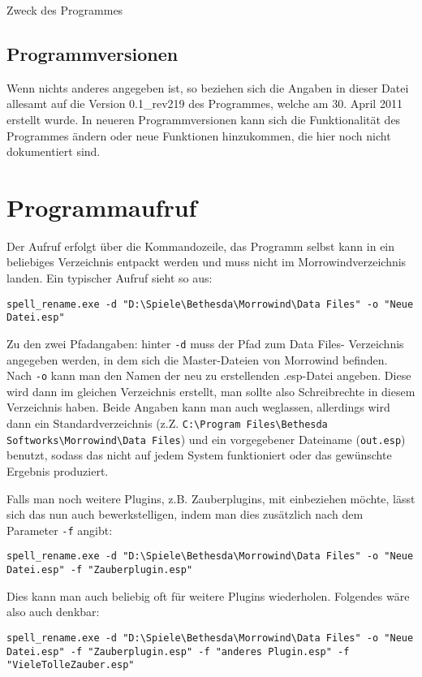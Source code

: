 \documentclass[12pt,oneside,a4paper]{article}
\begin{document}
\begin{section}{Zweck des Programmes}
\subsection{Programmversionen}
Wenn nichts anderes angegeben ist, so beziehen sich die Angaben in dieser Datei
allesamt auf die Version 0.1\_rev219 des Programmes, welche am 30. April 2011
erstellt wurde. In neueren Programmversionen kann sich die Funktionalit\"{a}t des
Programmes \"{a}ndern oder neue Funktionen hinzukommen, die hier noch nicht
dokumentiert sind.
\end{section}

\section{Programmaufruf}
Der Aufruf erfolgt \"{u}ber die Kommandozeile, das Programm selbst kann in ein
beliebiges Verzeichnis entpackt werden und muss nicht im Morrowindverzeichnis
landen. Ein typischer Aufruf sieht so aus:

\texttt{spell\_rename.exe -d "D:\textbackslash{}Spiele\textbackslash{}Bethesda\textbackslash{}Morrowind\textbackslash{}Data Files" -o "Neue Datei.esp"}

Zu den zwei Pfadangaben: hinter \texttt{-d} muss der Pfad zum Data Files-
Verzeichnis angegeben werden, in dem sich die Master-Dateien von Morrowind befinden.
Nach \texttt{-o} kann man den Namen der neu zu erstellenden .esp-Datei angeben.
Diese wird dann im gleichen Verzeichnis erstellt, man sollte also Schreibrechte
in diesem Verzeichnis haben. Beide Angaben kann man auch weglassen, allerdings
wird dann ein Standardverzeichnis (z.Z. \texttt{C:\textbackslash{}Program Files\textbackslash{}Bethesda Softworks\textbackslash{}Morrowind\textbackslash{}Data Files})
und ein vorgegebener Dateiname (\texttt{out.esp}) benutzt, sodass das nicht auf
jedem System funktioniert oder das gew\"{u}nschte Ergebnis produziert.

Falls man noch weitere Plugins, z.B. Zauberplugins, mit einbeziehen m\"{o}chte,
l\"{a}sst sich das nun auch bewerkstelligen, indem man dies zus\"{a}tzlich nach
dem Parameter \texttt{-f} angibt:

\texttt{spell\_rename.exe -d "D:\textbackslash{}Spiele\textbackslash{}Bethesda\textbackslash{}Morrowind\textbackslash{}Data Files" -o "Neue Datei.esp" -f "Zauberplugin.esp"}

Dies kann man auch beliebig oft f\"{u}r weitere Plugins wiederholen.
Folgendes w\"{a}re also auch denkbar:

\texttt{spell\_rename.exe -d "D:\textbackslash{}Spiele\textbackslash{}Bethesda\textbackslash{}Morrowind\textbackslash{}Data Files" -o "Neue Datei.esp" -f "Zauberplugin.esp" -f "anderes Plugin.esp" -f "VieleTolleZauber.esp"}
\end{document}
